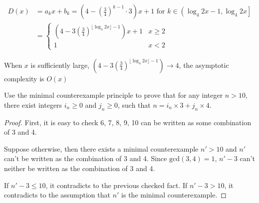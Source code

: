 \begin{exercise}[]
\begin{solution}
  \begin{equation}
    \begin{aligned}
      D(x) &=  a_k x + b_k = \left(4 - \left(\frac{3}{4}\right)^{k-1} \cdot 3\right) x + 1 \text{ for } k \in \left( \log_4 2x -1, \log_4 2x \right] \\
      &= \left \{  
        \begin{array}{ll}
          \left(4 - 3 \left(\frac{3}{4}\right)^{ \lfloor \log_4 {2x}\rfloor-1}\right) x + 1 & x \ge 2 \\
          1 & x < 2
        \end{array}
      \right.
    \end{aligned}
  \end{equation}
  
  When $x$ is sufficiently large, $\left(4 - 3 \left(\frac{3}{4}\right)^{ \lfloor \log_4 {2x}\rfloor-1}\right) \rightarrow 4$, the asymptotic complexity is $O(x)$



  \end{solution}
  \label{ex3}
\end{exercise}


\begin{exercise}[]{Use the minimal counterexample principle to prove that for any integer $n > 10$, there exist integers $i_n\geq0$ and $j_n\geq 0$, such that $n = i_n \times 3 + j_n \times 4$.}
  \begin{proof}
     First, it is easy to check 6, 7, 8, 9, 10 can be written as some combination of 3 and 4.

     Suppose otherwise, then there exists a minimal counterexample $n'>10$ and $n'$ can't be written as the combination of 3 and 4. Since $\text{gcd}(3,4)=1$,  $n' - 3$ can't neither be written as the combination of 3 and 4.
     
     If $n' - 3 \le 10$, it contradicts to the previous checked fact. If $n' -3 > 10$, it contradicts to the assumption that $n'$ is the minimal counterexample.
  \end{proof}
  \label{ex4}
\end{exercise}


